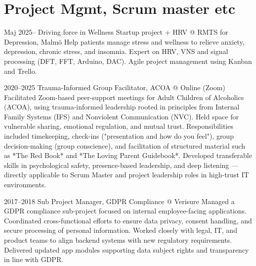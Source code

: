 
\large
\section {Project Mgmt, Scrum master etc}
\cventry
  {Maj 2025–}
  {Driving force in Wellness Startup project + HRV}
  {@ RMTS for Depression, Malmö}
  {} %
  {}
  {Help patients manage stress and wellness to relieve anxiety, depression, chronic stress, and insomnia. 
  Expert on HRV, VNS and signal processing (DFT, FFT, Arduino, DAC). Agile project management using Kanban and Trello.}

\cventry
   {2020–2025}
  {Trauma-Informed Group Facilitator, ACOA}
  {@ Online (Zoom)}
  {}
  {}
  {Facilitated Zoom-based peer-support meetings for Adult Children of Alcoholics (ACOA), using trauma-informed leadership rooted in principles from Internal Family Systems (IFS) and Nonviolent Communication (NVC). Held space for vulnerable sharing, emotional regulation, and mutual trust. Responsibilities included timekeeping, check-ins ("presentation and how do you feel"), group decision-making (group conscience), and facilitation of structured material such as *The Red Book* and *The Loving Parent Guidebook*. Developed transferable skills in psychological safety, presence-based leadership, and deep listening — directly applicable to Scrum Master and project leadership roles in high-trust IT environments.}

\cventry
  {2017–2018}
  {Sub Project Manager, GDPR Compliance}
  {@ Verisure}
  {}
  {}
  {Managed a GDPR compliance sub-project focused on internal employee-facing applications. Coordinated cross-functional efforts to ensure data privacy, consent handling, and secure processing of personal information. Worked closely with legal, IT, and product teams to align backend systems with new regulatory requirements. Delivered updated app modules supporting data subject rights and transparency in line with GDPR.}



